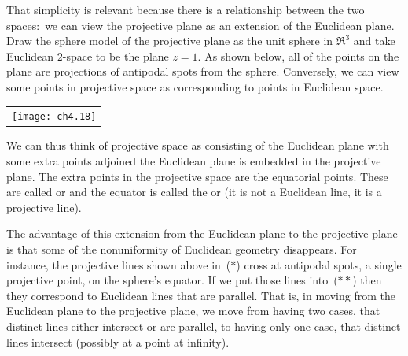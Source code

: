 That simplicity is relevant because there is a 
relationship between the two spaces:~we can view the 
projective plane as an extension of the Euclidean plane.
Draw the sphere model of the projective plane as the unit sphere in $\Re^3$
and take Euclidean $2$-space to be the plane $z=1$.
As shown below, all of the points on the plane are projections of  
antipodal spots from the sphere.
Conversely, we can view some points
in projective space as corresponding to points in Euclidean space.
\begin{center}
 \hfill
  \begin{tabular}{@{}c@{}}\texttt{[image: ch4.18]}\end{tabular}
 \hfill\llap{($**$)}
\end{center}
We can thus think of projective space as consisting of the Euclidean plane 
with some extra points adjoined \Dash  
the Euclidean plane is embedded in the projective plane.
The extra points in the projective space are the equatorial points.
These are called %
or 
and the equator is called the 
%
 or 
(it is not a Euclidean line, it is a projective line). 

The advantage of this extension from the Euclidean plane 
to the projective plane
is that some of the nonuniformity 
of Euclidean geometry disappears.
For instance, the projective lines shown above in~($*$) cross
at antipodal spots, a single projective point, on the sphere's equator.
If we put those lines into~($**$) then they correspond to Euclidean lines that
are parallel.
That is, in moving from the Euclidean plane to the projective plane, we move
from having two cases, 
that distinct lines either intersect or are parallel, to having only
one case, that distinct lines intersect (possibly at a point at infinity). 


